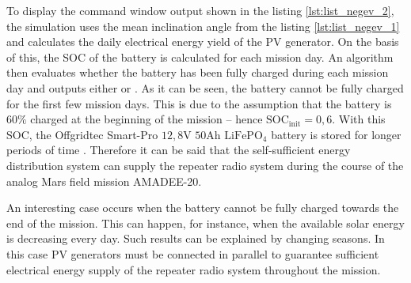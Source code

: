 To display the command window output shown in the listing \ref{lst:list_negev_2}, the simulation uses the mean inclination angle from the listing \ref{lst:list_negev_1} and calculates the daily electrical energy yield of the PV generator. On the basis of this, the SOC of the battery is calculated for each mission day. An algorithm then evaluates whether the battery has been fully charged during each mission day and outputs either  or . As it can be seen, the battery cannot be fully charged for the first few mission days. This is due to the assumption that the battery is $60\%$ charged at the beginning of the mission -- hence $\mathrm{SOC_{init}} = 0,6$. With this SOC, the Offgridtec Smart-Pro $12,8\mathrm{V}$ $50\mathrm{Ah}$ $\mathrm{LiFePO}_4$ battery is stored for longer periods of time \cite{Offgridtec:2020}. Therefore it can be said that the self-sufficient energy distribution system can supply the repeater radio system during the course of the analog Mars field mission AMADEE-20.

An interesting case occurs when the battery cannot be fully charged towards the end of the mission. This can happen, for instance, when the available solar energy is decreasing every day. Such results can be explained by changing seasons. In this case PV generators must be connected in parallel to guarantee sufficient electrical energy supply of the repeater radio system throughout the mission.

